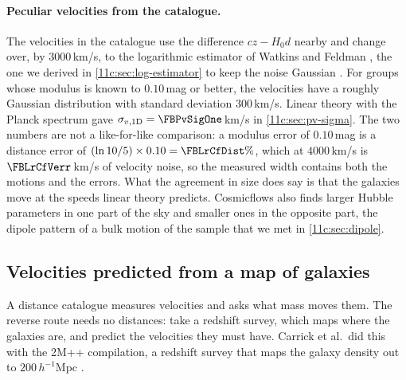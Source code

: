 \paragraph{Peculiar velocities from the catalogue.} The velocities in the catalogue use
the difference $cz-H_0d$ nearby and change over, by $3000$\,km/s, to the logarithmic
estimator of Watkins and Feldman \cite{WatkinsFeldman2015}, the one we derived in
\cref{11c:sec:log-estimator} to keep the noise Gaussian
\cite[eqs.~(9)--(11)]{Tully2023CF4}. For groups whose modulus is known to $0.10$\,mag
or better, the velocities have a roughly Gaussian distribution with standard deviation
$300$\,km/s. Linear theory with the Planck spectrum gave $\sigma_{v,1\mathrm D}=\FBPvSigOne$\,km/s
in \cref{11c:sec:pv-sigma}. The two numbers are not a like-for-like comparison: a
modulus error of $0.10$\,mag is a distance error of $(\ln10/5)\times0.10=\FBLrCfDist\%$,
which at $4000$\,km/s is $\FBLrCfVerr$\,km/s of velocity noise, so the measured width
contains both the motions and the errors. What the agreement in size does say is that
the galaxies move at the speeds linear theory predicts. Cosmicflows also finds larger
Hubble parameters in one part of the sky and smaller ones in the opposite part, the
dipole pattern of a bulk motion of the sample that we met in \cref{11c:sec:dipole}.

\subsection{Velocities predicted from a map of galaxies}
\label{11c:sec:research-recon}

A distance catalogue measures velocities and asks what mass moves them. The reverse
route needs no distances: take a redshift survey, which maps where the galaxies are,
and predict the velocities they must have. Carrick et al.\ did this with the 2M++
compilation, a redshift survey that maps the galaxy density out to $200\,h^{-1}$Mpc
\cite{Carrick2015}.

